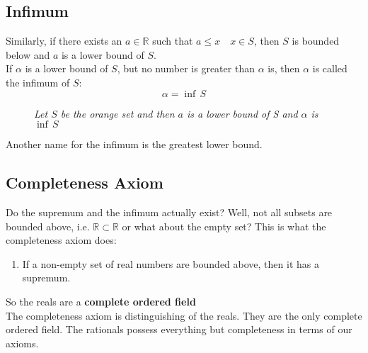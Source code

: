 \documentclass{article}
\newcommand{\R}{\mathbb{R}}
\newcommand{\sub}{\subset}
\renewcommand{\a}{\alpha}
\begin{document}
\subsection{Infimum}
Similarly, if there exists an $a \in \R$ such that $a \le x \quad x \in S$, then $S$ is {\color{blue}bounded below} and $a$ is a {\color{blue}lower bound of $S$}.\\

If $\a$ is a lower bound of $S$, but no number is greater than $\a$ is, then $\a$ is called the {\color{blue} infimum } of $S$:
$$ \a = \inf \, S $$
\vspace{-30pt}
\begin{figure}[H]
  \centering
{}
\caption{\textit{Let $S$ be the orange set and then $a$ is a lower bound of S and $\a$ is $\inf\, S$}}
\end{figure}
Another name for the infimum is the greatest lower bound.

\subsection{Completeness Axiom}

Do the supremum and the infimum actually exist? Well, not all subsets are bounded above, i.e. $\R \sub \R$ or what about the empty set? This is what the completeness axiom does:
\begin{enumerate}
  \item If a non-empty set of real numbers are bounded above, then it has a supremum.
\end{enumerate}

So the reals are a {\color{red} \textbf{complete ordered field} }\\

The completeness axiom is distinguishing of the reals. They are the only complete ordered field. The rationals possess everything but completeness in terms of our axioms.\\
\end{document}
